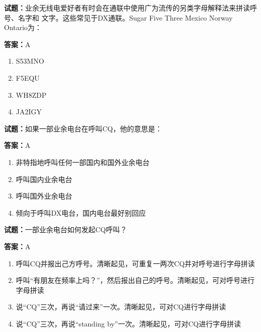 \documentclass{ctexbook}
\begin{document}




\vspace{1em}

\textbf{试题：}业余无线电爱好者有时会在通联中使用广为流传的另类字母解释法来拼读呼号、名字和
文字。这些常见于DX通联。Sugar Five Three Mexico Norway Ontario为： 

\textbf{答案：}A 

\begin{enumerate}[leftmargin=3em]
  \item S53MNO 

  \item F5EQU 

  \item WH8ZDP 

  \item JA2IGY 

\end{enumerate}





\vspace{1em}

\textbf{试题：}如果一部业余电台在呼叫CQ，他的意思是： 

\textbf{答案：}A 

\begin{enumerate}[leftmargin=3em]
  \item 非特指地呼叫任何一部国内和国外业余电台 

  \item 呼叫国内业余电台 

  \item 呼叫国外业余电台 

  \item 倾向于呼叫DX电台，国内电台最好别回应 

\end{enumerate}





\vspace{1em}

\textbf{试题：}一部业余电台如何发起CQ呼叫？ 

\textbf{答案：}A 


\begin{enumerate}[leftmargin=3em]
  \item 呼叫CQ并报出己方呼号。清晰起见，可重复一两次CQ并对呼号进行字母拼读 

  \item 呼叫“有朋友在频率上吗？”，然后报出自己的呼号。清晰起见，可对呼号进行字母拼读 

  \item 说“CQ”三次，再说“请过来”一次。清晰起见，可对CQ进行字母拼读 

  \item 说“CQ”三次，再说“standing by”一次。清晰起见，可对CQ进行字母拼读 

\end{enumerate}
\end{document}
